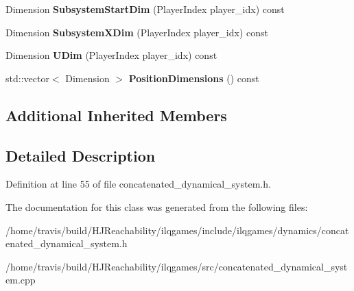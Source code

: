\begin{DoxyCompactItemize}
\item 
Dimension {\bfseries Subsystem\+Start\+Dim} (Player\+Index player\+\_\+idx) const \hypertarget{classilqgames_1_1_concatenated_dynamical_system_a14a0206022b433d335fb70fcf9e5ac85}{}\label{classilqgames_1_1_concatenated_dynamical_system_a14a0206022b433d335fb70fcf9e5ac85}

\item 
Dimension {\bfseries Subsystem\+X\+Dim} (Player\+Index player\+\_\+idx) const \hypertarget{classilqgames_1_1_concatenated_dynamical_system_a8a41a816bf3320cd6d78548beac02d80}{}\label{classilqgames_1_1_concatenated_dynamical_system_a8a41a816bf3320cd6d78548beac02d80}

\item 
Dimension {\bfseries U\+Dim} (Player\+Index player\+\_\+idx) const \hypertarget{classilqgames_1_1_concatenated_dynamical_system_a99e27c1644875b924741e037bcb54460}{}\label{classilqgames_1_1_concatenated_dynamical_system_a99e27c1644875b924741e037bcb54460}

\item 
std\+::vector$<$ Dimension $>$ {\bfseries Position\+Dimensions} () const \hypertarget{classilqgames_1_1_concatenated_dynamical_system_af87c59c62ce8e7a8d57f9a394f7ca4e0}{}\label{classilqgames_1_1_concatenated_dynamical_system_af87c59c62ce8e7a8d57f9a394f7ca4e0}

\end{DoxyCompactItemize}
\subsection*{Additional Inherited Members}


\subsection{Detailed Description}


Definition at line 55 of file concatenated\+\_\+dynamical\+\_\+system.\+h.



The documentation for this class was generated from the following files\+:\begin{DoxyCompactItemize}
\item 
/home/travis/build/\+H\+J\+Reachability/ilqgames/include/ilqgames/dynamics/concatenated\+\_\+dynamical\+\_\+system.\+h\item 
/home/travis/build/\+H\+J\+Reachability/ilqgames/src/concatenated\+\_\+dynamical\+\_\+system.\+cpp\end{DoxyCompactItemize}

